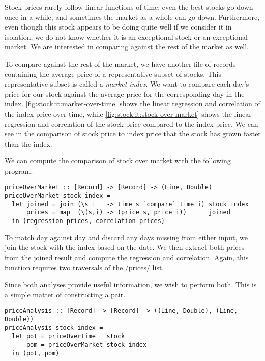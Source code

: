 Stock prices rarely follow linear functions of time; even the best stocks go down once in a while, and sometimes the market as a whole can go down.
Furthermore, even though this stock appears to be doing quite well if we consider it in isolation, we do not know whether it is an exceptional stock or an exceptional market.
We are interested in comparing against the rest of the market as well.

To compare against the rest of the market, we have another file of records containing the average price of a representative subset of stocks.
This representative subset is called a \emph{market index}.
We want to compare each day's price for our stock against the average price for the corresponding day in the index.
\autoref{fig:stock:it:market-over-time} shows the linear regression and correlation of the index price over time, while \autoref{fig:stock:it:stock-over-market} shows the linear regression and correlation of the stock price compared to the index price.
We can see in the comparison of stock price to index price that the stock has grown faster than the index.

We can compute the comparison of stock over market with the following program.

\begin{lstlisting}
priceOverMarket :: [Record] -> [Record] -> (Line, Double)
priceOverMarket stock index =
  let joined = join (\s i   -> time s `compare` time i) stock index
      prices = map  (\(s,i) -> (price s, price i))      joined
  in (regression prices, correlation prices)
\end{lstlisting}

To match day against day and discard any days missing from either input, we join the stock with the index based on the date.
We then extract both prices from the joined result and compute the regression and correlation.
Again, this function requires two traversals of the \Hs/prices/ list.

Since both analyses provide useful information, we wish to perform both.
This is a simple matter of constructing a pair.

\begin{lstlisting}
priceAnalysis :: [Record] -> [Record] -> ((Line, Double), (Line, Double))
priceAnalysis stock index =
  let pot = priceOverTime   stock
      pom = priceOverMarket stock index
  in (pot, pom)
\end{lstlisting}

